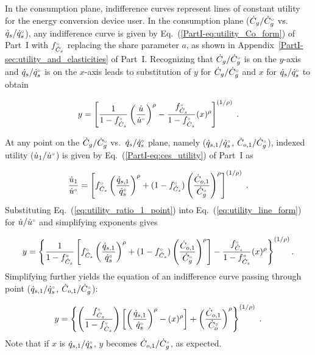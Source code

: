 In the consumption plane,
indifference curves represent lines of constant utility
for the energy conversion device user.
In the consumption plane
($\dot{C}_g/{}{\dot{C}}^{\scriptscriptstyle \circ}_g$ vs.\ $\dot{q}_s/{}{\dot{q}}^{\scriptscriptstyle \circ}_s$), 
any indifference curve 
is given by 
Eq.~(\ref{PartI-eq:utility_Co_form}) of Part~I
with ${}{f}^{\scriptscriptstyle \circ}_{\dot{C}_s}$ replacing the share parameter $a$, 
as shown in Appendix~\ref{PartI-sec:utility_and_elasticities} of Part~I.
Recognizing that 
$\dot{C}_g/{}{\dot{C}}^{\scriptscriptstyle \circ}_g$ is on the $y$-axis and 
$\dot{q}_s/{}{\dot{q}}^{\scriptscriptstyle \circ}_s$ is on the $x$-axis
leads to substitution of 
$y$ for $\dot{C}_g/{}{\dot{C}}^{\scriptscriptstyle \circ}_g$ and 
$x$ for $\dot{q}_s/{}{\dot{q}}^{\scriptscriptstyle \circ}_s$ to obtain

\begin{equation} \label{eq:utility_line_form}
  y = \left[ \frac{1}{1 - {}{f}^{\scriptscriptstyle \circ}_{\dot{C}_s}} \left( \frac{\dot{u}}{{}{\dot{u}}^{\scriptscriptstyle \circ}} \right)^\rho 
            - \frac{{}{f}^{\scriptscriptstyle \circ}_{\dot{C}_s}}{1 - {}{f}^{\scriptscriptstyle \circ}_{\dot{C}_s}} (x)^\rho \right]^{(1/\rho)} \; .
\end{equation}

At any point on the 
$\dot{C}_g/{}{\dot{C}}^{\scriptscriptstyle \circ}_g$ vs.\ $\dot{q}_s/{}{\dot{q}}^{\scriptscriptstyle \circ}_s$ plane,
namely ($\dot{q}_{s,1}/{}{\dot{q}}^{\scriptscriptstyle \circ}_s$, $\dot{C}_{o,1}/{}{\dot{C}}^{\scriptscriptstyle \circ}_g$),
indexed utility ($\dot{u}_1/{}{\dot{u}}^{\scriptscriptstyle \circ}$) is given by Eq.~(\ref{PartI-eq:ces_utility}) of Part~I as

\begin{equation} \label{eq:utility_ratio_1_point}
  \frac{\dot{u}_1}{{}{\dot{u}}^{\scriptscriptstyle \circ}} =
        \left[ {}{f}^{\scriptscriptstyle \circ}_{\dot{C}_s} \left( \frac{\dot{q}_{s,1}}{{}{\dot{q}}^{\scriptscriptstyle \circ}_s} \right)^\rho
        + (1-{}{f}^{\scriptscriptstyle \circ}_{\dot{C}_s}) \left( \frac{\dot{C}_{o,1}}{{}{\dot{C}}^{\scriptscriptstyle \circ}_g} \right)^\rho  \right]^{(1/\rho)} \; .
\end{equation}
%
Substituting Eq.~(\ref{eq:utility_ratio_1_point}) into Eq.~(\ref{eq:utility_line_form})
for $\dot{u}/{}{\dot{u}}^{\scriptscriptstyle \circ}$
and simplifying exponents gives

\begin{equation}
  y = \left\{ \frac{1}{1 - {}{f}^{\scriptscriptstyle \circ}_{\dot{C}_s}} \left[ {}{f}^{\scriptscriptstyle \circ}_{\dot{C}_s} \left( \frac{\dot{q}_{s,1}}{{}{\dot{q}}^{\scriptscriptstyle \circ}_s} \right)^\rho 
        + (1-{}{f}^{\scriptscriptstyle \circ}_{\dot{C}_s}) \left( \frac{\dot{C}_{o,1}}{{}{\dot{C}}^{\scriptscriptstyle \circ}_g} \right)^\rho   \right] 
            - \frac{{}{f}^{\scriptscriptstyle \circ}_{\dot{C}_s}}{1 - {}{f}^{\scriptscriptstyle \circ}_{\dot{C}_s}} (x)^\rho \right\}^{(1/\rho)}  .
\end{equation}
%
Simplifying further yields
the equation of an indifference curve passing through point 
($\dot{q}_{s,1}/{}{\dot{q}}^{\scriptscriptstyle \circ}_s$, $\dot{C}_{o,1}/{}{\dot{C}}^{\scriptscriptstyle \circ}_g$):

\begin{equation} \label{eq:indiff_curve_eqn}
  y = \left\{ \left( \frac{{}{f}^{\scriptscriptstyle \circ}_{\dot{C}_s}}{1 - {}{f}^{\scriptscriptstyle \circ}_{\dot{C}_s}} \right) \left[ \left( \frac{\dot{q}_{s,1}}{{}{\dot{q}}^{\scriptscriptstyle \circ}_s} \right)^\rho 
                                                          - (x)^\rho  \right]
        + \left( \frac{\dot{C}_{o,1}}{{}{\dot{C}}^{\scriptscriptstyle \circ}_{o}} \right)^\rho \right\}^{(1/\rho)} \; .
\end{equation}
%
Note that if $x$ is $\dot{q}_{s,1}/{}{\dot{q}}^{\scriptscriptstyle \circ}_s$,
$y$ becomes $\dot{C}_{o,1}/{}{\dot{C}}^{\scriptscriptstyle \circ}_g$,
as expected.
